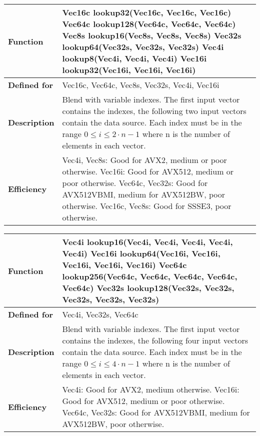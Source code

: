 \documentclass[vcl_manual.tex]{subfiles}
\begin{document}
\begin{tabular}{|p{30mm}|p{120mm}|}
\hline
\bfseries Function & 
Vec16c lookup32(Vec16c, Vec16c, Vec16c) \newline
Vec64c lookup128(Vec64c, Vec64c, Vec64c) \newline
Vec8s lookup16(Vec8s, Vec8s, Vec8s) \newline
Vec32s lookup64(Vec32s, Vec32s, Vec32s) \newline
Vec4i lookup8(Vec4i, Vec4i, Vec4i) \newline
Vec16i lookup32(Vec16i, Vec16i, Vec16i) \\ \hline
\bfseries Defined for & Vec16c, Vec64c, Vec8s, Vec32s, Vec4i, Vec16i \\ \hline
\bfseries Description & Blend with variable indexes. The first input vector contains the indexes, the following two input vectors contain the data source. Each index must be in the range  $0 \leq i \leq 2\cdot n - 1$ where n is the number of elements in each vector. \\ \hline
\bfseries Efficiency & 
Vec4i, Vec8s: Good for AVX2, medium or poor otherwise. \newline
Vec16i: Good for AVX512, medium or poor otherwise. \newline
Vec64c, Vec32s: Good for AVX512VBMI, medium for AVX512BW, poor otherwise. \newline
Vec16c, Vec8s: Good for SSSE3, poor otherwise. \\ \hline
\end{tabular}


\begin{tabular}{|p{30mm}|p{120mm}|}
\hline
\bfseries Function & 
Vec4i lookup16(Vec4i, Vec4i, Vec4i, Vec4i, Vec4i) \newline
Vec16i lookup64(Vec16i, Vec16i, Vec16i, Vec16i, Vec16i) \newline
Vec64c lookup256(Vec64c, Vec64c, Vec64c, Vec64c, Vec64c) \newline
Vec32s lookup128(Vec32s, Vec32s, Vec32s, Vec32s, Vec32s) \\ \hline
\bfseries Defined for & Vec4i, Vec32s, Vec64c \\ \hline
\bfseries Description & Blend with variable indexes. The first input vector contains the indexes, the following four input vectors contain the data source. Each index must be in the range  $0 \leq i \leq 4\cdot n - 1$ where n is the number of elements in each vector. \\ \hline
\bfseries Efficiency & 
Vec4i: Good for AVX2, medium otherwise. \newline
Vec16i: Good for AVX512, medium or poor otherwise. \newline
Vec64c, Vec32s: Good for AVX512VBMI, medium for AVX512BW, poor otherwise. 
\\ \hline
\end{tabular}
\end{document}
